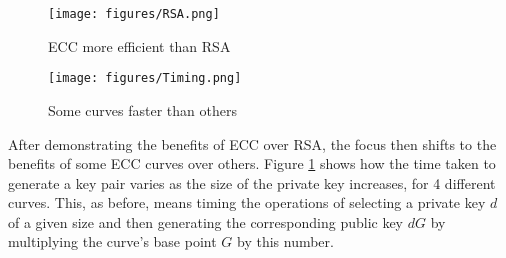 \documentclass[12pt,a4paper]{article}
\begin{document}





\begin{figure}[!htb]
    \begin{minipage}{0.5\textwidth}
        \centering
        \texttt{[image: figures/RSA.png]}
        \caption{ECC more efficient than RSA}
        \label{fig:rsa}
    \end{minipage}\hfill
    \begin{minipage}{0.5\textwidth}
        \centering
        \texttt{[image: figures/Timing.png]}
        \caption{Some curves faster than others}
        \label{fig:curves}
    \end{minipage}
\end{figure}

\vspace{5mm}

After demonstrating the benefits of ECC over RSA, the focus then shifts to the benefits of some ECC curves over others. 
Figure \ref{fig:curves} shows how the time taken to generate a key pair varies as the size of the private key increases, for 4 different curves. 
This, as before, means timing the operations of selecting a private key $d$ of a given size and then generating the corresponding public key $dG$ by 
multiplying the curve's base point $G$ by this number. 
\end{document}
